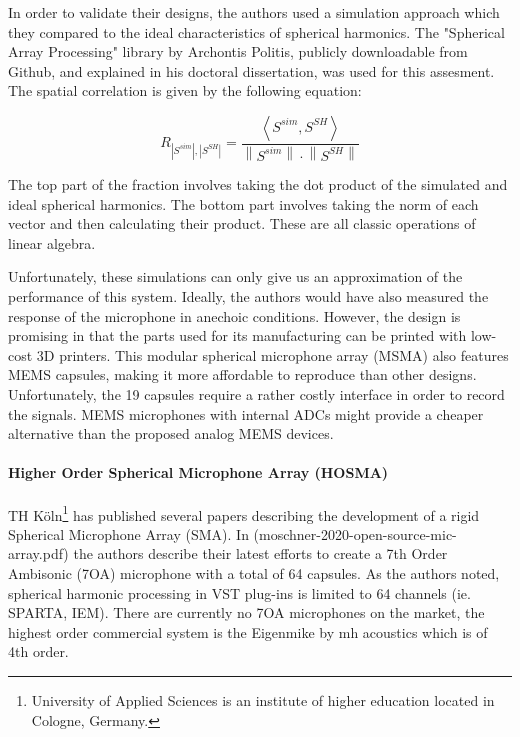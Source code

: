 In order to validate their designs, the authors used a simulation approach which they compared to the ideal characteristics of spherical harmonics. The "Spherical Array Processing" library by Archontis Politis, publicly downloadable from Github, and explained in his doctoral dissertation, was used for this assesment. The spatial correlation is given by the following equation: 

\begin{equation}
R_{\left|S^{s i m}\right|,\left|S^{S H}\right|}=\frac{\left\langle S^{s i m}, S^{S H}\right\rangle}{\left\|S^{s i m}\right\| \cdot\left\|S^{S H}\right\|}
\end{equation}

The top part of the fraction involves taking the dot product of the simulated and ideal spherical harmonics. The bottom part involves taking the norm of each vector and then calculating their product. These are all classic operations of linear algebra. 

Unfortunately, these simulations can only give us an approximation of the performance of this system. Ideally, the authors would have also measured the response of the microphone in anechoic conditions. However, the design is promising in that the parts used for its manufacturing can be printed with low-cost 3D printers. This modular spherical microphone array (MSMA) also features MEMS capsules, making it more affordable to reproduce than other designs. Unfortunately, the 19 capsules require a rather costly interface in order to record the signals. MEMS microphones with internal ADCs might provide a cheaper alternative than the proposed analog MEMS devices. 

\paragraph{Higher Order Spherical Microphone Array (HOSMA)}

TH Köln\footnote{University of Applied Sciences is an institute of higher education located in Cologne, Germany.} has published several papers describing the development of a rigid Spherical Microphone Array (SMA). In (moschner-2020-open-source-mic-array.pdf) the authors describe their latest efforts to create a 7th Order Ambisonic (7OA) microphone with a total of 64 capsules. As the authors noted, spherical harmonic processing in VST plug-ins is limited to 64 channels (ie. SPARTA, IEM).  There are currently no 7OA microphones on the market, the highest order commercial system is the Eigenmike by mh acoustics which is of 4th order. 

